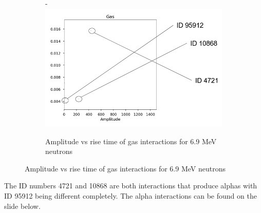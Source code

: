 \documentclass[a4paper]{article}
\begin{document}
\begin{figure}[H]
\begin{minipage}{0.5\textwidth}
        \caption{Amplitude vs rise time primary volume for 6.9 MeV neutrons}
        \label{fig:prob1_6_1}
    \end{minipage}
\begin{figure}[H]-
        \centering
        \includegraphics[width=1\linewidth]{Fast/gas-id-7.PNG}
        \caption{Amplitude vs rise time of gas interactions for 6.9 MeV neutrons}
        \label{fig:south2d}
        \end{figure}
\end{figure}
\noindent The ID numbers 4721 and 10868 are both interactions that produce alphas with ID 95912 being different completely. The alpha interactions can be found on the slide below.
\end{document}
